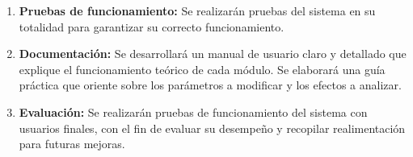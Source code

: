 \begin{enumerate}[noitemsep]
    \item \textbf{Pruebas de funcionamiento:} Se realizarán pruebas del sistema en su totalidad para
    garantizar su correcto funcionamiento.
    
    \item \textbf{Documentación:} Se desarrollará un manual de usuario claro y detallado que explique
    el funcionamiento teórico de cada módulo. Se elaborará una guía práctica que oriente sobre los
    parámetros a modificar y los efectos a analizar.

    \item \textbf{Evaluación:} Se realizarán pruebas de funcionamiento del sistema con usuarios finales,
    con el fin de evaluar su desempeño y recopilar realimentación para futuras mejoras.
\end{enumerate}
